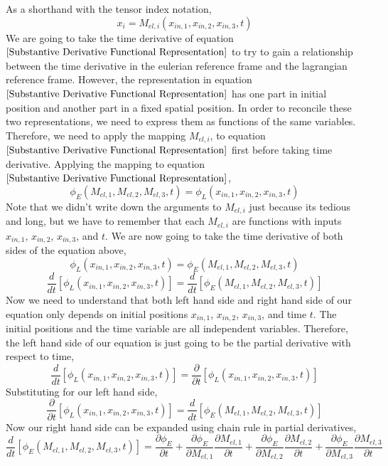 As a shorthand with the tensor index notation,
$$x_{i} = M_{el,i}(x_{in,1}, x_{in,2}, x_{in,3}, t)$$
We are going to take the time derivative of equation $\ref{Substantive Derivative Functional Representation}$ to try to gain a relationship between the time derivative in the eulerian reference frame and the lagrangian reference frame.
However, the representation in equation $\ref{Substantive Derivative Functional Representation}$ has one part in initial position and another part in a fixed spatial position.
In order to reconcile these two representations, we need to express them as functions of the same variables.
Therefore, we need to apply the mapping $M_{el,i}$, to equation $\ref{Substantive Derivative Functional Representation}$ first before taking time derivative.
Applying the mapping to equation $\ref{Substantive Derivative Functional Representation}$,
$$\phi_{E}(M_{el,1}, M_{el,2}, M_{el,3}, t) = \phi_{L}(x_{in,1},x_{in,2},x_{in,3},t) $$
Note that we didn't write down the arguments to $M_{el,i}$ just because its tedious and long, but we have to remember that each $M_{el,i}$ are functions with inputs $x_{in,1}$, $x_{in,2}$, $x_{in,3}$, and $t$.
We are now going to take the time derivative of both sides of the equation above,
$$\phi_{L}(x_{in,1},x_{in,2},x_{in,3},t) = \phi_{E}(M_{el,1}, M_{el,2}, M_{el,3}, t)$$
$$\frac{d}{d t}\left[\phi_{L}(x_{in,1},x_{in,2},x_{in,3},t)\right] = \frac{d}{d t}\left[\phi_{E}(M_{el,1}, M_{el,2}, M_{el,3}, t)\right]$$
Now we need to understand that both left hand side and right hand side of our equation only depends on initial positions $x_{in,1}$, $x_{in,2}$, $x_{in,3}$, and time $t$.
The initial positions and the time variable are all independent variables.
Therefore, the left hand side of our equation is just going to be the partial derivative with respect to time,
$$\frac{d}{d t}\left[\phi_{L}(x_{in,1},x_{in,2},x_{in,3},t)\right] = \frac{\partial}{\partial t}\left[\phi_{L}(x_{in,1},x_{in,2},x_{in,3},t)\right]$$
Substituting for our left hand side,
\begin{equation}\frac{\partial}{\partial t}\left[\phi_{L}(x_{in,1},x_{in,2},x_{in,3},t)\right] = \frac{d}{d t}\left[\phi_{E}(M_{el,1}, M_{el,2}, M_{el,3}, t)\right] \label{Almost Done Substantive Derivative primitive 1}\end{equation}
Now our right hand side can be expanded using chain rule in partial derivatives,
$$\frac{d}{d t}\left[\phi_{E}(M_{el,1}, M_{el,2}, M_{el,3}, t)\right] = \frac{\partial \phi_{E}}{\partial t} + \frac{\partial \phi_{E}}{\partial M_{el,1}}\frac{\partial M_{el,1}}{\partial t} + \frac{\partial \phi_{E}}{\partial M_{el,2}}\frac{\partial M_{el,2}}{\partial t} + \frac{\partial \phi_{E}}{\partial M_{el,3}}\frac{\partial M_{el,3}}{\partial t}$$
